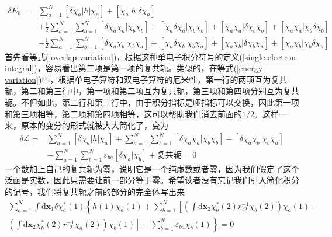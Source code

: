 \documentclass[12pt,a4paper,openany,twoside]{book}
\numberwithin{equation}{section}
\begin{document}
          \begin{equation}
            \begin{aligned}
              \delta E_{0}=&\sum_{a=1}^{N}\left[\delta \chi_{a}|h| \chi_{a}\right]+\left[\chi_{a}|h| \delta \chi_{a}\right]\\
              &+\frac{1}{2} \sum_{a=1}^{N} \sum_{b=1}^{N}\left[\delta \chi_{a} \chi_{a} | \chi_{b} \chi_{b}\right]+\left[\chi_{a} \delta \chi_{a} | \chi_{b} \chi_{b}\right]+\left[\chi_{a} \chi_{a} | \delta \chi_{b} \chi_{b}\right]+\left[\chi_{a} \chi_{a} | \chi_{b} \delta{\chi_b}\right]\\
              &-\frac{1}{2} \sum_{a=1}^{N} \sum_{b=1}^{N}\left[\delta \chi_{a} \chi_{b} | \chi_{b} \chi_{a}\right]+\left[\chi_{a} \delta \chi_{b} | \chi_{b} \chi_{a}\right]+\left[\chi_{a} \chi_{b} | \delta \chi_{b} \chi_{a}\right]+\left[\chi_{a} \chi_{b} | \chi_{b} \delta \chi_a \right]
            \end{aligned}
            \label{energy variation}
          \end{equation}
          首先看等式(\ref{overlap variation})，根据这种单电子积分符号的定义(\ref{single electron integral})，容易看出第二项是第一项的复共轭。类似的，在等式(\ref{energy variation})中，根据单电子算符和双电子算符的厄米性，第一行的两项互为复共轭，第二和第三行中，第一项和第二项互为复共轭，第三项和第四项分别互为复共轭。不但如此，第二行和第三行中，由于积分指标是哑指标可以交换，因此第一项和第三项相等，第二项和第四项相等，这可以帮助我们消去前面的$1/2$。这样一来，原本的变分的形式就被大大简化了，变为
          \begin{equation}
            \begin{aligned}
              \delta \mathscr{L}=&\sum_{a=1}^{N}\left[\delta \chi_{a}|h| \chi_{a}\right]+\sum_{a=1}^{N} \sum_{b=1}^{N}\left[\delta \chi_{a} \chi_{a} | \chi_{b} \chi_{b}\right]-\left[\delta \chi_{a} \chi_{b} | \chi_{b} \chi_{a}\right]\\
              &-\sum_{a=1}^{N} \sum_{b=1}^{N} \varepsilon_{b a}\left[\delta \chi_{a} | \chi_{b}\right]+\text{复共轭} = 0
            \end{aligned}
          \end{equation}
          一个数加上自己的复共轭为零，说明它是一个纯虚数或者零，因为我们假定了这个泛函是实数，因此只需要让前一部分等于零。希望读者没有忘记我们引入简化积分的记号，我们将复共轭之前的部分的完全体写出来
          \begin{equation}
            \begin{aligned}
              \sum_{a=1}^{N} \int \mathrm{d} \mathbf{x}_{1} \delta \chi_{a}^{*}(1)\left\{h(1) \chi_{a}(1)+\sum_{b=1}^{N}\left[\left(\int \mathrm{d} \mathbf{x}_{2} \chi_{b}^{*}(2) r_{12}^{-1} \chi_{b}(2)\right) \chi_{a}(1)-\right.\right. \\ 
              \left.\left. \left(\int \mathrm{d} \mathbf{x}_{2} \chi_{b}^{*}(2) r_{12}^{-1} \chi_{a}(2)\right) \chi_{b}(1)\right] -\sum_{b=1}^{N} \varepsilon_{b a} \chi_{b}(1)\right\} = 0
            \end{aligned}
          \end{equation}
\end{document}

